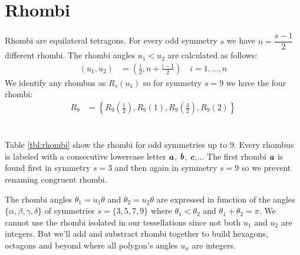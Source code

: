 \documentclass[11pt]{article}
\def\mathbi#1{\textbf{\em #1}}
\begin{document}
\section{Rhombi}

Rhombi are equilateral tetragons. For every odd symmetry $s$ we have $n = \dfrac{s-1}2$ different rhombi. The rhombi angles $u_1 < u_2$ are calculated as follows:
\begin{align}
(u_1, u_2) &= \left(\frac{i}{2},  n + \frac{i-1}{2}\right) \quad i = 1,...,n
\end{align}
We identify any rhombus as $R_s(u_1)$ so for symmetry $s=9$ we have the four rhombi:
\begin{align}
R_9 &= \left\{ R_9\left(\frac{1}2\right), R_9(1), R_9\left(\frac{3}2\right), R_9(2) \right\}
\end{align}
\\\\
Table \ref{tbl:rhombi} show the rhombi for odd symmetries up to $9$. Every rhombus is labeled with a consecutive lowercase letter $\mathbi{a}$, $\mathbi{b}$, $\mathbi{c}$,... The first rhombi $\mathbi{a}$ is found first in symmetry $s=3$ and then again in symmetry $s=9$ so we prevent renaming congruent rhombi.

The rhombi angles $\theta_1 = u_1\theta$ and $\theta_2 = u_2\theta$ are expressed in function of the angles $\{\alpha,\beta,\gamma,\delta\}$ of symmetries $s=\{3,5,7,9\}$ where $\theta_1 < \theta_2$ and $\theta_1 + \theta_2 = \pi$. We cannot use the rhombi isolated in our tessellations since not both $u_1$ and $u_2$ are integers. But we'll add and substract rhombi together to build hexagons, octagons and beyond where all polygon's angles $u_n$ are integers.
\end{document}
